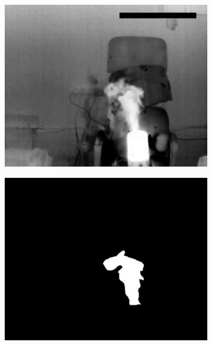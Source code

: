 \documentclass[14pt, a4paper]{extreport}
\begin{document}
\begin{figure}[h!]
		\begin{subfigure}{.32\textwidth}
			\centering
			\includegraphics[width = \textwidth]{image/chapter_3/examples/tep/185}
		\end{subfigure}
		\begin{subfigure}{.32\textwidth}
			\centering
			\includegraphics[width = \textwidth]{image/chapter_3/examples/mask_razmet/185}
		\end{subfigure}
		\begin{subfigure}{.32\textwidth}
			\centering

\end{subfigure}
\end{figure}
\end{document}
